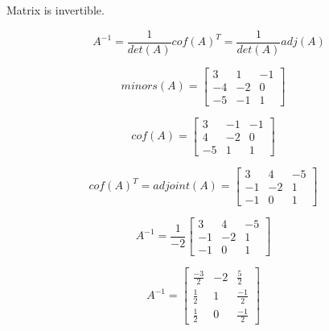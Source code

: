 \documentclass[12pt]{article}
\begin{document}
Matrix is invertible.

$$A^{-1} = \frac{1}{det(A)} cof(A)^T = \frac{1}{det(A)} adj(A)$$

$$
minors(A) = 
\begin{bmatrix} 
3 & 1 & -1 \\
-4 & -2 & 0 \\
-5 & -1 & 1
\end{bmatrix}
\quad
$$

$$
cof(A) = 
\begin{bmatrix} 
3 & -1 & -1 \\
4 & -2 & 0 \\
-5 & 1 & 1
\end{bmatrix}
\quad
$$



$$
cof(A)^T = adjoint(A) = 
\begin{bmatrix} 
3 & 4 & -5 \\
-1 & -2 & 1 \\
-1 & 0 & 1
\end{bmatrix}
\quad
$$

$$
A^{-1} = 
\frac{1}{-2}
\begin{bmatrix} 
3 & 4 & -5 \\
-1 & -2 & 1 \\
-1 & 0 & 1
\end{bmatrix}
\quad
$$

$$
A^{-1} = 
\begin{bmatrix} 
\frac{-3}{2} & -2 & \frac{5}{2} \\
\frac{1}{2} & 1 & \frac{-1}{2} \\
\frac{1}{2} & 0 & \frac{-1}{2}
\end{bmatrix}
\quad
$$
\end{document}
